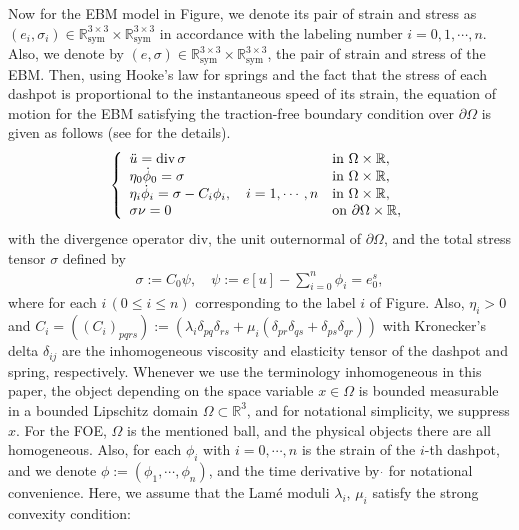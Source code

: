 \documentclass[a4paper,12pt]{article}
\newtheorem{a priori condition}[Th]{A priori condition}
\def\R{{\mathbb R}}
\def\dvg{\mbox{\rm div}}
\begin{document}
Now for the EBM model in Figure, we denote its pair of strain and stress as $(e_i,\sigma_i)\in \R^{3\times 3}_{\text{sym}}\times \R^{3\times 3}_{\text{sym}}$ in accordance with the labeling number $i=0,1,\cdots,n$. Also, we denote by $(e,\sigma)\in \R^{3\times 3}_{\text{sym}}\times \R^{3\times 3}_{\text{sym}}$, the pair of strain and stress of the EBM. Then, using Hooke's law for springs and the fact that the stress of each dashpot is proportional to the instantaneous speed of its strain, the equation of motion for the EBM satisfying the traction-free boundary condition over $\partial\Omega$ is given as follows (see \cite{HKLNT} for the details). 
\begin{equation}\label{s1.1}
\left\{
\begin{array}{ll}
\ddot{u}=\dvg\, \sigma &\mbox{\rm in}~\Omega\times {\mathbb R},\\
\eta_0\dot{\phi}_0=\sigma &    \mbox{\rm in}~\Omega\times {\mathbb R},\\
\eta_i\dot{\phi}_i=\sigma -C_i\phi_i, \quad i=1,\cdots,n &    \mbox{\rm in}~\Omega\times {\mathbb R},\\
\sigma\nu=0 &\mbox{\rm on}~\partial\Omega\times {\mathbb R},\\
\end{array}
\right.
\end{equation}
with the divergence operator $\text{div}$, the unit outernormal of $\partial\Omega$, and the total stress tensor $\sigma$ defined by
\begin{align}\label{s1.2}
\sigma :=C_0\psi,\quad
  \psi:=
  e[u]-\sum_{i=0}^n\phi_i=e_0^s,
\end{align}
where for each $i\,(0\le i\le n)$ corresponding to the label $i$ of Figure. Also, $\eta_i>0$ and $C_i=((C_i)_{pqrs}):=({\lambda}_i\delta_{pq}\delta_{rs}+{\mu}_i(\delta_{pr}
\delta_{qs}+\delta_{ps}\delta_{qr}))$ with Kronecker's delta $\delta_{ij}$ are the inhomogeneous viscosity and elasticity tensor of the dashpot and spring, respectively. Whenever we use the terminology inhomogeneous in this paper, the object depending on the space variable $x\in\Omega$ is bounded measurable in a bounded Lipschitz domain $\Omega\subset{\mathbb{R}}^3$, and for notational simplicity, we suppress $x$. For the FOE, $\Omega$ is the mentioned ball, and the physical objects there are all homogeneous. Also, for each $\phi_i$ with $i=0,\cdots,n$ is the strain of the $i$-th dashpot, and we denote $\phi:=(\phi_1,\cdots,\phi_n)$, 
and the time derivative by $\dot{}$ for notational convenience. Here, we assume that the Lam\'e moduli $\lambda_i,\,\mu_i$ satisfy the strong convexity condition:
\end{document}
